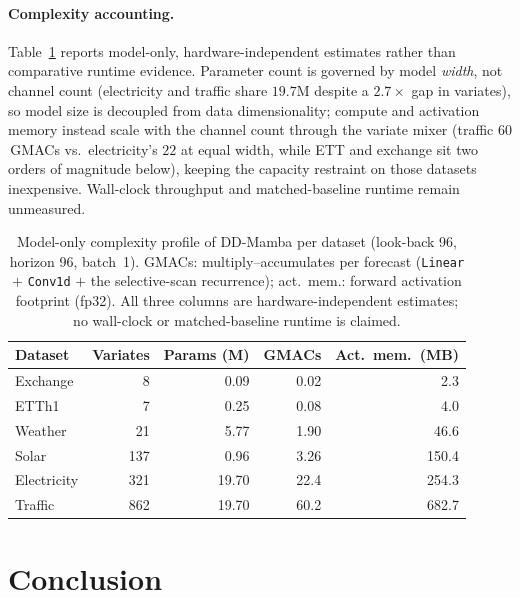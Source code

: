 \documentclass[runningheads]{llncs}
\newcommand{\model}{DD-Mamba}
\begin{document}
\paragraph{Complexity accounting.} Table~\ref{tab:efficiency} reports
model-only, hardware-independent estimates rather than comparative runtime
evidence. Parameter count is governed
by model \emph{width}, not channel count (electricity and traffic share
$19.7$M despite a $2.7{\times}$ gap in variates), so model size is decoupled
from data dimensionality; compute and activation memory instead scale with
the channel count through the variate mixer (traffic $60$\,GMACs vs.\
electricity's $22$ at equal width, while ETT and exchange sit two orders of
magnitude below), keeping the capacity restraint on those datasets
inexpensive. Wall-clock throughput and matched-baseline runtime remain
unmeasured.

\begin{table}[tb]
\centering
\caption{Model-only complexity profile of \model{} per dataset (look-back 96,
horizon 96, batch~1). GMACs: multiply--accumulates per forecast
(\texttt{Linear} $+$ \texttt{Conv1d} $+$ the selective-scan recurrence);
act.\ mem.: forward activation footprint (fp32). All three columns are
hardware-independent estimates; no wall-clock or matched-baseline runtime is
claimed.}
\label{tab:efficiency}
\begin{tabular}{@{}lrrrr@{}}
\toprule
Dataset & Variates & Params (M) & GMACs & Act.\ mem.\ (MB) \\
\midrule
Exchange & 8 & 0.09 & 0.02 & 2.3 \\
ETTh1 & 7 & 0.25 & 0.08 & 4.0 \\
Weather & 21 & 5.77 & 1.90 & 46.6 \\
Solar & 137 & 0.96 & 3.26 & 150.4 \\
Electricity & 321 & 19.70 & 22.4 & 254.3 \\
Traffic & 862 & 19.70 & 60.2 & 682.7 \\
\bottomrule
\end{tabular}
\end{table}

\section{Conclusion}
\label{sec:conclusion}
\end{document}
